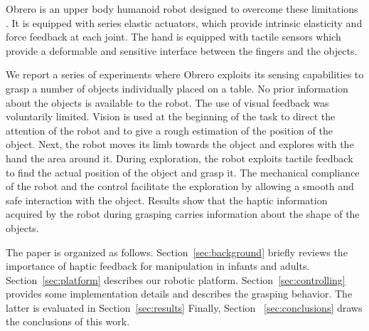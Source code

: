 Obrero is an upper body humanoid robot designed to
overcome these limitations \cite{obrero}. It is equipped with series elastic
actuators, which provide intrinsic elasticity and force feedback
at each joint. The hand is equipped with tactile sensors
\cite{etorresjSoft} which provide a deformable and sensitive
interface between the fingers and the objects.

We report a series of experiments where Obrero exploits its
sensing capabilities to grasp a number of objects individually
placed on a table. No prior information about the objects is
available to the robot. The use of visual feedback was voluntarily
limited. Vision is used at the beginning of the task to direct the
attention of the robot and to give a rough estimation of the
position of the object. Next, the robot moves its limb towards the
object and explores with the hand the area around it. During
exploration, the robot exploits tactile feedback to find the
actual position of the object and grasp it. The mechanical
compliance of the robot and the control facilitate the exploration
by allowing a smooth and safe interaction with the object. Results
show that the haptic information acquired by the robot during
grasping carries information about the shape of the objects.

The paper is organized as follows. Section~\ref{sec:background}
briefly reviews the importance of haptic feedback for manipulation
in infants and adults. Section~\ref{sec:platform} describes our
robotic platform. Section~\ref{sec:controlling} provides some
implementation details and describes the grasping behavior. The
latter is evaluated in Section~\ref{sec:results} Finally, Section
~\ref{sec:conclusions} draws the conclusions of this work.
